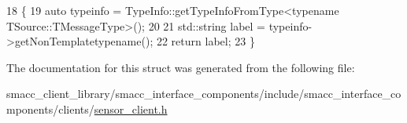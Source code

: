 \begin{DoxyCode}
18   \{
19     \textcolor{keyword}{auto} typeinfo = TypeInfo::getTypeInfoFromType<typename TSource::TMessageType>();
20 
21     std::string label = typeinfo->getNonTemplatetypename();
22     \textcolor{keywordflow}{return} label;
23   \}
\end{DoxyCode}


The documentation for this struct was generated from the following file\+:\begin{DoxyCompactItemize}
\item 
smacc\+\_\+client\+\_\+library/smacc\+\_\+interface\+\_\+components/include/smacc\+\_\+interface\+\_\+components/clients/\hyperlink{sensor__client_8h}{sensor\+\_\+client.\+h}\end{DoxyCompactItemize}
